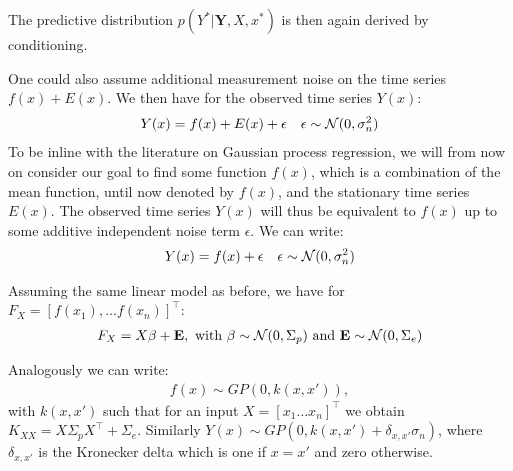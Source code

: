 The predictive distribution $p(Y^{\ast} | \mathbf{Y}, X, x^{\ast})$ is then again derived by conditioning.

One could also assume additional measurement noise on the time series $f(x) + E(x)$.
We then have for the observed time series $Y(x)$:
\begin{align*}
    Y(x) = f(x) + E(x) + \epsilon   && \epsilon \sim \operatorname{\mathcal{N}}(0, \sigma_n^{2})
\end{align*}
To be inline with the literature on Gaussian process regression, we will from now on consider
our goal to find some function $f(x)$, which is a combination of the mean function, until now denoted by $f(x)$,
and the stationary time series $E(x)$.
The observed time series $Y(x)$ will thus be equivalent to $f(x)$ up to some additive independent noise term $\epsilon$.
We can write:
\begin{align*}
    Y(x) = f(x) + \epsilon && \epsilon \sim \operatorname{\mathcal{N}}(0, \sigma_n^{2})
\end{align*}

Assuming the same linear model as before, we have for $F_X = [f(x_1), \dots f(x_n)]^{\top}$:
\begin{gather*}
    F_X = X \beta + \mathbf{E}, \text{ with $\beta \sim \operatorname{\mathcal{N}}(0, \Sigma_p)$ and $\mathbf{E} \sim \operatorname{\mathcal{N}}(0, \Sigma_e)$}
\end{gather*}
%

Analogously we can write:
\begin{gather*}
    f(x) \sim GP(0, k(x, x')),
\end{gather*}
with $k(x,x')$ such that for an input $X = [x_1 \dots x_n]^{\top}$ we obtain $K_{XX} =  X \Sigma_p X^{\top} + \Sigma_e$.
Similarly $Y(x) \sim GP(0, k(x, x') + \delta_{x,x'}\sigma_n)$,
where $\delta_{x,x'}$ is the Kronecker delta which is one if $x = x'$ and zero otherwise.

